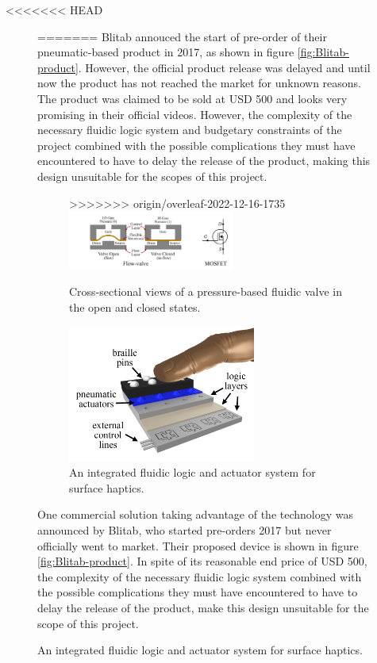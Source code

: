<<<<<<< HEAD
\begin{figure}[ht]\centering
=======
Blitab annouced the start of pre-order of their pneumatic-based product in 2017, as shown in figure \ref{fig:Blitab-product}. However, the official product release was delayed and until now the product has not reached the market for unknown reasons. The product was claimed to be sold at USD 500  and looks very promising in their official videos. However, the complexity of the necessary fluidic logic system and budgetary constraints of the project combined with the possible complications they must have encountered to have to delay the release of the product, making this design unsuitable for the scopes of this project.

\begin{figure}\centering
>>>>>>> origin/overleaf-2022-12-16-1735
    \includegraphics[width=0.6\textwidth]{figures/pneumatic-schema.png}
\caption{Cross-sectional views of a pressure-based fluidic valve in the open and closed states.}
\label{fig:pneumatic-schema}
\end{figure}
\begin{figure}[ht]\centering
    \includegraphics[height=4.5cm]{figures/fluidic logic system.png}
\caption{An integrated fluidic logic and actuator system for surface haptics.}
\label{fig:Integrated fluidic logic system}
\end{figure}

One commercial solution taking advantage of the technology was announced by Blitab, who started pre-orders 2017 but never officially went to market. Their proposed device is shown in figure \ref{fig:Blitab-product}.
In spite of its reasonable end price of USD 500, the complexity of the necessary fluidic logic system combined with the possible complications they must have encountered to have to delay the release of the product, make this design unsuitable for the scope of this project.


\end{figure}
